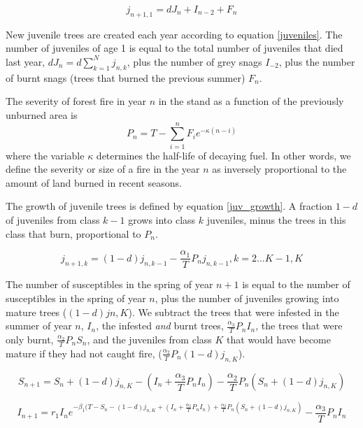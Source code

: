 \begin{equation}
j_{n+1, 1} = d J_n + I_{n-2} + F_n
\label{juveniles}
\end{equation}


New juvenile trees are created each year according to equation \ref{juveniles}. The number of juveniles of age 1 is equal to the total number of juveniles that died last year, $d J_n =  d \sum_{k = 1}^{N} j_{n,k}$, plus the number of grey snags $I_{-2}$, plus the number of burnt snags (trees that burned the previous summer) $F_n$. 

The severity of forest fire in year $n$ in the stand as a function of the previously unburned area is
\begin{equation}
P_n = T -\sum_{i=1}^{n}  F_i e^{-\kappa (n - i)}
\end{equation}
where the variable $\kappa$ determines the half-life of decaying fuel. In other words, we define the severity or size of a fire in the year $n$ as inversely proportional to the amount of land burned in recent seasons.


The growth of juvenile trees is defined by equation \ref{juv_growth}. A fraction $1-d$ of juveniles from class $k-1$ grows into class $k$ juveniles, minus the trees in this class that burn, proportional to $P_n$. 

\begin{equation}
  j_{n+1, k} = (1-d) j_{n, k - 1} - \frac{\alpha_1}{T}P_n j_{n,k-1}, k = 2 ... K-1 ,K
  \label{juv_growth}
  \end{equation}
  


 The number of susceptibles in the spring of year $n+1$ is equal to the number of susceptibles in the spring of year $n$, plus the number of juveniles growing into mature trees ($(1 - d) j {n, K} $). We subtract the trees that were infested in the summer of year $n$, $I_n$, the infested \textit{and} burnt trees, $\frac{\alpha_3}{T} P_n I_n$, the trees that were only burnt, $\frac{\alpha_2}{T} P_n S_n$, and the juveniles from class $K$ that would have become mature if they had not caught fire, ($\frac{\alpha_2}{T} P_n (1-d) j_{n, K}$).

\begin{equation}
S_{n+1} = S_n + (1 - d) j_{n, K} - (I_n + \frac{\alpha_3}{T} P_n I_n) - \frac{\alpha_2}{T} P_n \left( S_n + (1-d) j_{n, K}\right)
\end{equation}


\begin{equation}
I_{n+1} = r_1 I_n e^{-\beta_1 (T - S_n - (1 - d) j_{n, K} + (I_n + \frac{\alpha_2}{T} P_n I_n) +  \frac{\alpha_2}{T} P_n \left( S_n + (1-d) j_{n, K}\right) } - \frac{\alpha_3}{T} P_n I_n
\end{equation}

